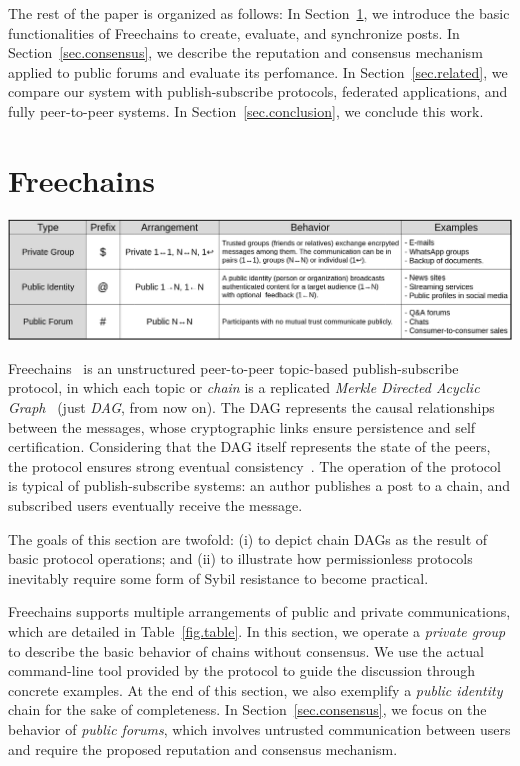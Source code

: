 \documentclass[12pt]{article}
\newcommand{\FC}       {Freechains\xspace}
\begin{document}
The rest of the paper is organized as follows:
In Section~\ref{sec.freechains}, we introduce the basic functionalities of \FC
to create, evaluate, and synchronize posts.
In Section~\ref{sec.consensus}, we describe the reputation and consensus
mechanism applied to public forums and evaluate its perfomance.
In Section~\ref{sec.related}, we compare our system with publish-subscribe
protocols, federated applications, and fully peer-to-peer systems.
In Section~\ref{sec.conclusion}, we conclude this work.

\section{\FC}
\label{sec.freechains}

\begin{table}
\centering
\includegraphics[width=\textwidth]{arrangements.png}
\caption{The three types of chains and arrangements in \FC.}
\label{fig.table}
\end{table}

\FC~\cite{fcs.sbseg20} is an unstructured peer-to-peer topic-based
publish-subscribe protocol, in which each topic or \emph{chain} is a replicated
\emph{Merkle Directed Acyclic Graph}~\cite{p2p.ipfs} (just \emph{DAG}, from now
on).
The DAG represents the causal relationships between the messages, whose
cryptographic links ensure persistence and self certification.
Considering that the DAG itself represents the state of the peers, the protocol
ensures strong eventual consistency~\cite{fed.matrix,p2p.byz}.
%
The operation of the protocol is typical of publish-subscribe systems: an
author publishes a post to a chain, and subscribed users eventually receive the
message.

The goals of this section are twofold:
    (i)  to depict chain DAGs as the result of basic protocol operations; and
    (ii) to illustrate how permissionless protocols inevitably require some
         form of Sybil resistance to become practical.

\FC supports multiple arrangements of public and private communications, which
are detailed in Table~\ref{fig.table}.
In this section, we operate a \emph{private group} to describe the basic
behavior of chains without consensus.
We use the actual command-line tool provided by the protocol to guide the
discussion through concrete examples.
At the end of this section, we also exemplify a \emph{public identity} chain
for the sake of completeness.
In Section~\ref{sec.consensus}, we focus on the behavior of \emph{public
forums}, which involves untrusted communication between users and require the
proposed reputation and consensus mechanism.
\end{document}
